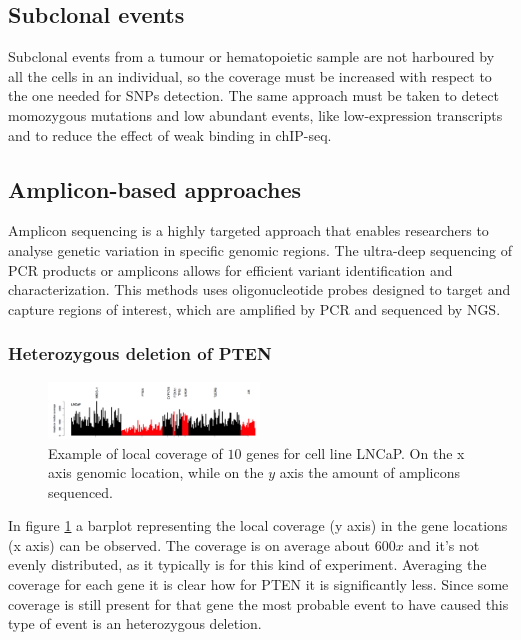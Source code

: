     \subsection{Subclonal events}
    Subclonal events from a tumour or hematopoietic sample are not harboured by all the cells in an individual, so the coverage must be increased with respect to the one needed for SNPs detection.
    The same approach must be taken to detect momozygous mutations and low abundant events, like low-expression transcripts and to reduce the effect of weak binding in chIP-seq.

    \subsection{Amplicon-based approaches}
    Amplicon sequencing is a highly targeted approach that enables researchers to analyse genetic variation in specific genomic regions.
    The ultra-deep sequencing of PCR products or amplicons allows for efficient variant identification and characterization.
    This methods uses oligonucleotide probes designed to target and capture regions of interest, which are amplified by PCR and sequenced by NGS.

        \subsubsection{Heterozygous deletion of PTEN}

        \begin{figure}[H]
            \centering
            \includegraphics[width=0.5\textwidth]{local_coverage.png}
            \caption{Example of local coverage of $10$ genes for cell line LNCaP. On the x axis genomic location, while on the $y$ axis the amount of amplicons sequenced.}
            \label{fig:local}
        \end{figure}

        In figure \ref{fig:local} a barplot representing the local coverage (y axis) in the gene locations (x axis) can be observed.
        The coverage is on average about $600x$ and it's not evenly distributed, as it typically is for this kind of experiment.
        Averaging the coverage for each gene it is clear how for PTEN it is significantly less.
        Since some coverage is still present for that gene the most probable event to have caused this type of event is an heterozygous deletion.

